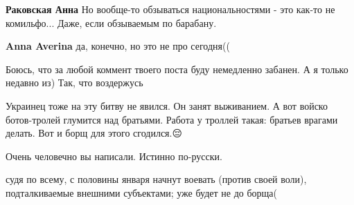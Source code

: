 \begin{itemize}
\begin{itemize}
\textbf{Раковская Анна} Но вообще-то обзываться национальностями - это как-то не комильфо... Даже, если обзываемым по барабану.

 
\textbf{Anna Averina} да, конечно, но это не про сегодня((
\end{itemize}

 
Боюсь, что за любой коммент твоего поста буду немедленно забанен. А я только недавно из) Так, что воздержусь \Smiley[1.0][yellow]

 

Украинец тоже на эту битву не явился. Он занят выживанием. А вот войско
ботов-тролей глумится над братьями. Работа у троллей такая: братьев врагами
делать. Вот и борщ для этого сгодился.😔


 

Очень человечно вы написали. Истинно по-русски.

 
судя по всему, с половины января начнут воевать (против своей воли),
подталкиваемые внешними субъектами; уже будет не до борща(


 


\end{itemize}
